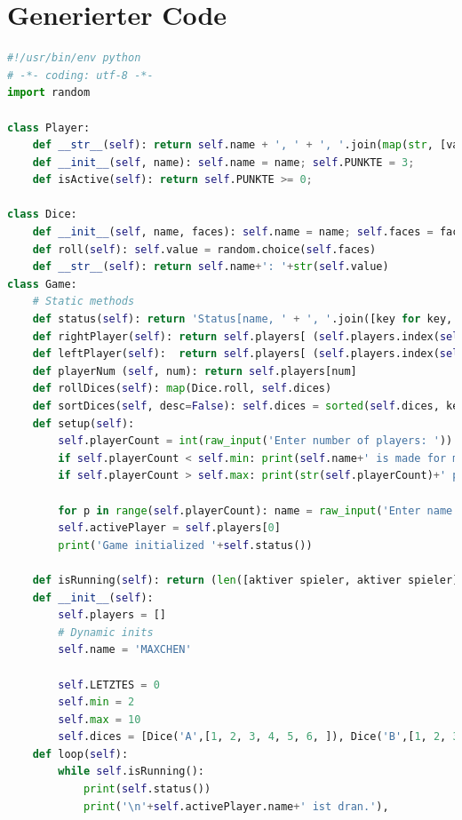 \section{Generierter Code} %
\label{sec:generierter_code}
\begin{lstlisting}[language=Python]
#!/usr/bin/env python
# -*- coding: utf-8 -*-
import random

class Player:
    def __str__(self): return self.name + ', ' + ', '.join(map(str, [value for key, value in self.__dict__.items() if key not in ['name']]))
    def __init__(self, name): self.name = name; self.PUNKTE = 3; 
    def isActive(self): return self.PUNKTE >= 0; 

class Dice:
    def __init__(self, name, faces): self.name = name; self.faces = faces; self.roll()
    def roll(self): self.value = random.choice(self.faces)
    def __str__(self): return self.name+': '+str(self.value)
class Game:
    # Static methods
    def status(self): return 'Status[name, ' + ', '.join([key for key, value in self.players[0].__dict__.items() if key not in ['name']]).lower()+']: '+' - '.join(map(str, self.players))
    def rightPlayer(self): return self.players[ (self.players.index(self.activePlayer) - 1) % self.playerCount]
    def leftPlayer(self):  return self.players[ (self.players.index(self.activePlayer) + 1) % self.playerCount]
    def playerNum (self, num): return self.players[num]
    def rollDices(self): map(Dice.roll, self.dices)
    def sortDices(self, desc=False): self.dices = sorted(self.dices, key=lambda dice: dice.value, reverse=desc)
    def setup(self):
        self.playerCount = int(raw_input('Enter number of players: '))
        if self.playerCount < self.min: print(self.name+' is made for more than '+str(self.min)+' players. Bring some friends ;-)'); exit()
        if self.playerCount > self.max: print(str(self.playerCount)+' players? Thats too much for '+self.name+'... Maximum: '+str(self.max)); exit()
        
        for p in range(self.playerCount): name = raw_input('Enter name of player #'+str(p)+': '); self.players.append(Player(name))
        self.activePlayer = self.players[0]
        print('Game initialized '+self.status())
        
    def isRunning(self): return (len([aktiver spieler, aktiver spieler]) > 1)
    def __init__(self):
        self.players = []
        # Dynamic inits
        self.name = 'MAXCHEN'
        
        self.LETZTES = 0
        self.min = 2
        self.max = 10
        self.dices = [Dice('A',[1, 2, 3, 4, 5, 6, ]), Dice('B',[1, 2, 3, 4, 5, 6, ]), ]
    def loop(self):
        while self.isRunning():   
            print(self.status())
            print('\n'+self.activePlayer.name+' ist dran.'),
            

\end{lstlisting}
